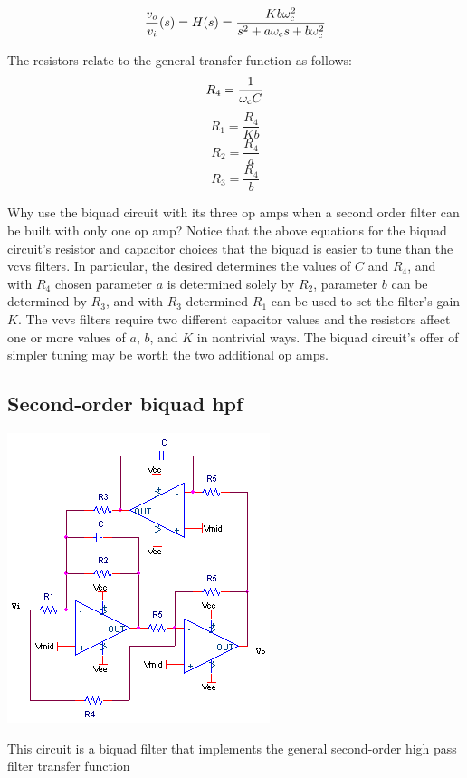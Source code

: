 \textcolor{red}{
\begin{equation}
\frac{\vout}{\vin}(s) = \Hs = \frac{Kb\wcutoff^2}{s^2 + a\wcutoff s + b\wcutoff^2}
\label{eq:2ndorderbiquadLPfilter}
\end{equation}
}

The resistors relate to the general transfer function as follows:
\begin{equation}
R_4 = \frac{1}{\omega_\mathrm{c} C}
\end{equation}
\begin{equation}
R_1 = \frac{R_4}{Kb}
\end{equation}
\begin{equation}
R_2 = \frac{R_4}{a}
\end{equation}
\begin{equation}
R_3 = \frac{R_4}{b}
\end{equation}

Why use the biquad circuit with its three op amps when a second order filter can be built with only one op amp?
Notice that the above equations for the biquad circuit's resistor and capacitor choices that the biquad is easier to tune than the \ac{vcvs} filters.
In particular, the desired \wcutoff determines the values of $C$ and $R_4$, and with $R_4$ chosen parameter $a$ is determined solely by $R_2$, parameter $b$ can be determined by $R_3$, and with $R_3$ determined $R_1$ can be used to set the filter's gain $K$.
The \ac{vcvs} filters require two different capacitor values and the resistors affect one or more values of $a$, $b$, and $K$ in nontrivial ways.
The biquad circuit's offer of simpler tuning may be worth the two additional op amps. \autocite[120-122]{op-amp-circuits-johnson}

\subsection{Second-order biquad \acl{hpf}}
\begin{center}
	\includegraphics{schematics/2ndorderbiquadHPfilter.PNG}
\end{center}
This circuit is a biquad filter that implements the general second-order high pass filter transfer function

